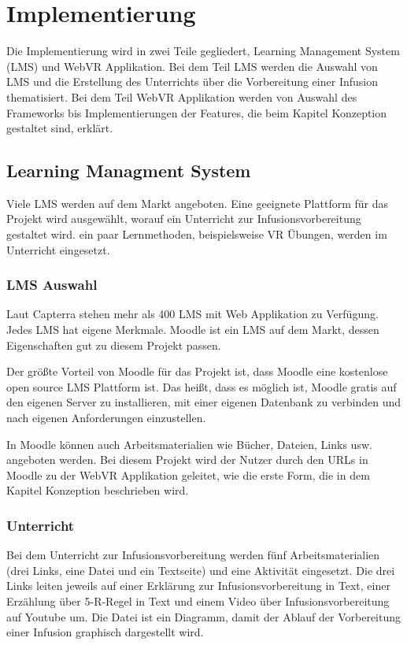 \chapter{Implementierung}

Die Implementierung wird in zwei Teile gegliedert, Learning Management System (LMS) und WebVR Applikation. Bei dem Teil LMS werden die Auswahl von LMS und die Erstellung des Unterrichts über die Vorbereitung einer Infusion thematisiert. Bei dem Teil WebVR Applikation werden von Auswahl des Frameworks bis Implementierungen der Features, die beim Kapitel Konzeption gestaltet sind, erklärt.

\section{Learning Managment System}

Viele LMS werden auf dem Markt angeboten. Eine geeignete Plattform für das Projekt wird ausgewählt, worauf ein Unterricht zur Infusionsvorbereitung gestaltet wird. ein paar Lernmethoden, beispielsweise VR Übungen, werden im Unterricht eingesetzt.

 \subsection{LMS Auswahl}

 Laut Capterra stehen mehr als 400 LMS mit Web Applikation zu Verfügung. Jedes LMS hat eigene Merkmale. Moodle ist ein LMS auf dem Markt, dessen Eigenschaften gut zu diesem Projekt passen.
 
 Der größte Vorteil von Moodle für das Projekt ist, dass Moodle eine kostenlose open source LMS Plattform ist. Das heißt, dass es möglich ist, Moodle gratis auf den eigenen Server zu installieren, mit einer eigenen Datenbank zu verbinden und nach eigenen Anforderungen einzustellen.
 
 In Moodle können auch Arbeitsmaterialien wie Bücher, Dateien, Links usw. angeboten werden. Bei diesem Projekt wird der Nutzer durch den URLs in Moodle zu der WebVR Applikation geleitet, wie die erste Form, die in dem Kapitel Konzeption beschrieben wird. 
 
 \subsection{Unterricht}
 Bei dem Unterricht zur Infusionsvorbereitung werden fünf Arbeitsmaterialien (drei Links, eine Datei und ein Textseite) und eine Aktivität eingesetzt. Die drei Links leiten jeweils auf einer Erklärung zur Infusionsvorbereitung in Text, einer Erzählung über 5-R-Regel in Text und einem Video über Infusionsvorbereitung auf Youtube um. Die Datei ist ein Diagramm, damit der Ablauf der Vorbereitung einer Infusion graphisch dargestellt wird.
 

